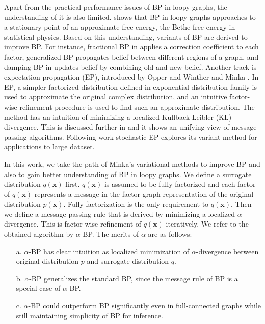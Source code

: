 \documentclass[conference,onecolumn]{IEEEtran}
\begin{document}
Apart from the practical performance issues of BP in loopy graphs, the understanding of it is also limited. \cite{Yedidia:2000:GBP:3008751.3008848} shows that BP in loopy graphs approaches to a stationary point of an approximate free energy, the Bethe free energy in statistical physics. Based on this understanding, variants of BP are derived to improve BP. For instance, fractional BP in \cite{Wiegerinck:2002:FBP:2968618.2968673} applies a correction coefficient to each factor, generalized BP \cite{Yedidia:2000:GBP:3008751.3008848} propagates belief between different regions of a graph, and damping BP in \cite{Pretti2005damping} updates belief by combining old and new belief. Another track is expectation propagation (EP), introduced by Opper and Winther \cite{Opper:2000:GPC:1121900.1121911} and Minka \cite{Minka:2001:EPA:647235.720257, Minka:2001:FAA:935427}. In EP, a simpler factorized distribution defined in exponential distribution family is used to approximate the original complex distribution, and an intuitive factor-wise refinement procedure is used to find such an approximate distribution. The method has an intuition of minimizing a localized Kullback-Leibler (KL) divergence. This is discussed further in \cite{divergence-measures-and-message-passing} and it shows an unifying view of message passing algorithms. Following work stochastic EP \cite{yingzhen2015sep} explores its variant method for applications to large dataset.

In this work, we take the path of Minka's variational methods to improve BP and also to gain better understanding of BP in loopy graphs.
We define a surrogate distribution $q(\bm{x})$ first. $q(\bm{x})$ is assumed to be fully factorized and each factor of $q(\bm{x})$ represents a message in the factor graph representation of the original distribution $p(\bm{x})$. Fully factorization is the only requirement to $q(\bm{x})$. Then we define a message passing rule that is derived by minimizing a localized $\alpha$-divergence. This is factor-wise refinement of $q(\bm{x})$ iteratively. We refer to the obtained algorithm by $\alpha$-BP. The merits of $\alpha$ are as follows:
\begin{itemize}
\item[a.]{$\alpha$-BP has clear intuition as localized minimization of $\alpha$-divergence between original distribution $p$ and surrogate distribution $q$.}
\item[b.]{$\alpha$-BP generalizes the standard BP, since the message rule of BP is a special case of $\alpha$-BP.}
\item[c.]{$\alpha$}-BP could outperform BP significantly even in full-connected graphs while still maintaining simplicity of BP for inference. 
\end{itemize}
\end{document}
